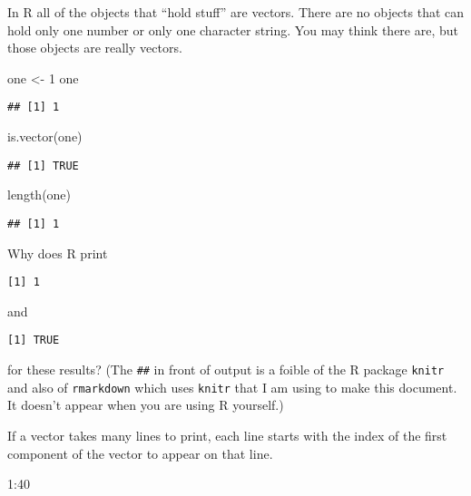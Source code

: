 \documentclass[
]{article}
\newenvironment{Shaded}{\begin{snugshade}}{\end{snugshade}}
\newcommand{\DecValTok}[1]{\textcolor[rgb]{0.00,0.00,0.81}{#1}}
\newcommand{\FunctionTok}[1]{\textcolor[rgb]{0.00,0.00,0.00}{#1}}
\newcommand{\NormalTok}[1]{#1}
\newcommand{\OtherTok}[1]{\textcolor[rgb]{0.56,0.35,0.01}{#1}}
\newcommand{\SpecialCharTok}[1]{\textcolor[rgb]{0.00,0.00,0.00}{#1}}
\begin{document}
In R all of the objects that ``hold stuff'' are vectors. There are no
objects that can hold only one number or only one character string. You
may think there are, but those objects are really vectors.

\begin{Shaded}
\begin{Highlighting}[]
\NormalTok{one }\OtherTok{\textless{}{-}} \DecValTok{1}
\NormalTok{one}
\end{Highlighting}
\end{Shaded}

\begin{verbatim}
## [1] 1
\end{verbatim}

\begin{Shaded}
\begin{Highlighting}[]
\FunctionTok{is.vector}\NormalTok{(one)}
\end{Highlighting}
\end{Shaded}

\begin{verbatim}
## [1] TRUE
\end{verbatim}

\begin{Shaded}
\begin{Highlighting}[]
\FunctionTok{length}\NormalTok{(one)}
\end{Highlighting}
\end{Shaded}

\begin{verbatim}
## [1] 1
\end{verbatim}

Why does R print

\begin{verbatim}
[1] 1
\end{verbatim}

and

\begin{verbatim}
[1] TRUE
\end{verbatim}

for these results? (The \texttt{\#\#} in front of output is a foible of
the R package \texttt{knitr} and also of \texttt{rmarkdown} which uses
\texttt{knitr} that I am using to make this document. It doesn't appear
when you are using R yourself.)

If a vector takes many lines to print, each line starts with the index
of the first component of the vector to appear on that line.

\begin{Shaded}
\begin{Highlighting}[]
\DecValTok{1}\SpecialCharTok{:}\DecValTok{40}
\end{Highlighting}
\end{Shaded}
\end{document}
